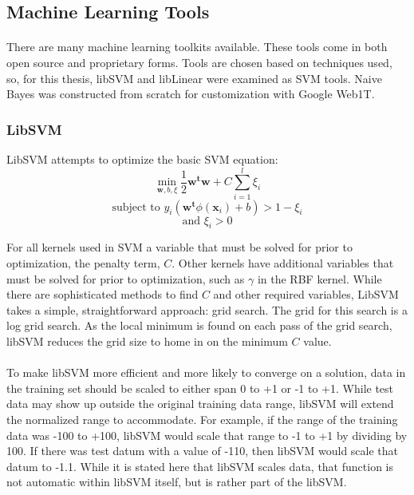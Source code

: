 	\subsection {Machine Learning Tools}
	\paragraph{} There are many machine learning toolkits available.  These tools come in both open source and proprietary forms.  Tools are chosen based on techniques used, so, for this thesis, libSVM and libLinear were examined as SVM tools.  Naive Bayes was constructed from scratch for customization with Google Web1T.

		\subsubsection{LibSVM} LibSVM attempts to optimize the basic SVM equation:
		\begin{equation} \min_{\mathbf{w}, b, \xi} \frac{1}{2} \mathbf{w^t w} + C \sum_{i=1}^{l} \xi_i \end{equation}
		\begin{equation} \text{subject to } y_i( \mathbf{w^t}\phi ( \mathbf{x}_i ) + b ) > 1- \xi_i \end{equation}
		\begin{equation} \text{and } \xi_i > 0\end{equation}

		For all kernels used in SVM a variable that must be solved for prior to optimization, the penalty term, $C$.  Other kernels have additional variables that must be solved for prior to optimization, such as $\gamma$ in the RBF kernel.  While there are sophisticated methods to find $C$ and other required variables, LibSVM takes a simple, straightforward approach: grid search.  The grid for this search is a log grid search.  As the local minimum is found on each pass of the grid search, libSVM reduces the grid size to home in on the minimum $C$ value.  

			\paragraph{} To make libSVM more efficient and more likely to converge on a solution, data in the training set should be scaled to either span 0 to +1 or -1 to +1.  While test data may show up outside the original training data range, libSVM will extend the normalized range to accommodate.  For example, if the range of the training data was -100 to +100, libSVM would scale that range to -1 to +1 by dividing by 100.  If there was test datum with a value of -110, then libSVM would scale that datum to -1.1.  While it is stated here that libSVM scales data, that function is not automatic within libSVM itself, but is rather part of the libSVM.
		
